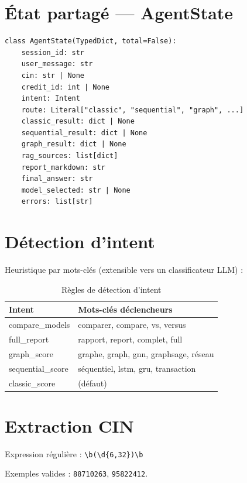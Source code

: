 \section{État partagé — AgentState}

\begin{lstlisting}[caption={Structure AgentState (extrait)},label={lst:agentstate}]
class AgentState(TypedDict, total=False):
    session_id: str
    user_message: str
    cin: str | None
    credit_id: int | None
    intent: Intent
    route: Literal["classic", "sequential", "graph", ...]
    classic_result: dict | None
    sequential_result: dict | None
    graph_result: dict | None
    rag_sources: list[dict]
    report_markdown: str
    final_answer: str
    model_selected: str | None
    errors: list[str]
\end{lstlisting}

\section{Détection d'intent}

Heuristique par mots-clés (extensible vers un classificateur LLM) :

\begin{table}[H]
  \centering
  \caption{Règles de détection d'intent}
  \begin{tabular}{|l|p{8cm}|}
    \hline
    \textbf{Intent} & \textbf{Mots-clés déclencheurs} \\
    \hline
    compare\_models & comparer, compare, vs, versus \\
    \hline
    full\_report & rapport, report, complet, full \\
    \hline
    graph\_score & graphe, graph, gnn, graphsage, réseau \\
    \hline
    sequential\_score & séquentiel, lstm, gru, transaction \\
    \hline
    classic\_score & (défaut) \\
    \hline
  \end{tabular}
\end{table}

\section{Extraction CIN}

Expression régulière : \texttt{\textbackslash b(\textbackslash d\{6,32\})\textbackslash b}

Exemples valides : \texttt{88710263}, \texttt{95822412}.

